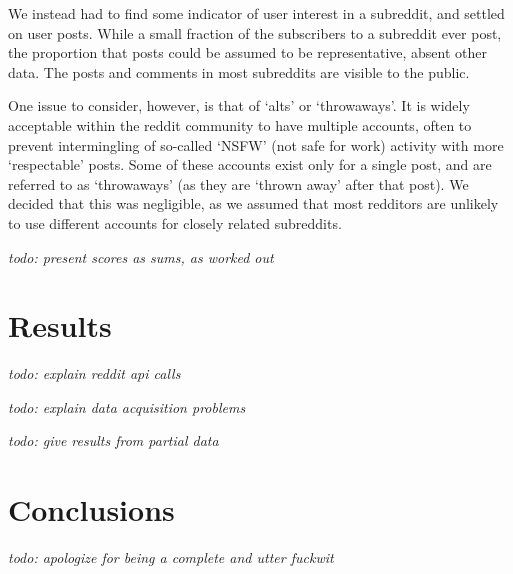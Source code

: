 \documentclass[journal, draftclsnofoot]{./styles/IEEEtran}
\begin{document}
We instead had to find some indicator of user interest in a subreddit,
and settled on user posts. While a small fraction of the subscribers to
a subreddit ever post, the proportion that posts could be assumed to be
representative, absent other data. The posts and comments in most
subreddits are visible to the public.

One issue to consider, however, is that of `alts' or `throwaways'.
It is widely acceptable within the reddit community to have multiple
accounts, often to prevent intermingling of so-called `NSFW' (not safe
for work) activity with more `respectable' posts. Some of these accounts
exist only for a single post, and are referred to as `throwaways' (as
they are `thrown away' after that post). We decided that this was
negligible, as we assumed that most redditors are unlikely to use
different accounts for closely related subreddits.

\textit{todo: present scores as sums, as worked out}

\section{Results}

\textit{todo: explain reddit api calls}

\textit{todo: explain data acquisition problems}

\textit{todo: give results from partial data}

\section{Conclusions}

\textit{todo: apologize for being a complete and utter fuckwit}




\nocite{*}




\end{document}
